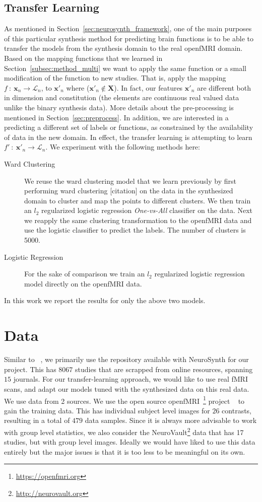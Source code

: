 \documentclass{article} %
\begin{document}
 \subsection{Transfer Learning}
 As mentioned in Section~\ref{sec:neurosynth_framework}, one of the main purposes of this particular synthesis method for predicting brain functions is to be able to transfer the models from the synthesis domain to the real openfMRI domain. Based on the mapping functions that we learned in Section~\ref{subsec:method_multi} we want to apply the same function or a small modification of the function to new studies. That is, apply the mapping $f\ :\ \mathbf{x}_n \rightarrow \mathcal{L}_n$, to $\mathbf{x}'_n$ where ($\mathbf{x}'_n \notin \mathbf{X}$). In fact, our features $\mathbf{x}'_n$ are different both in dimension and constitution (the elements are continuous real valued data unlike the binary synthesis data). More details about the pre-processing is mentioned in Section~\ref{sec:preprocess}. In addition, we are interested in a predicting a different set of labels or functions, as constrained by the availability of data in the new domain. In effect, the transfer learning is attempting to learn $f'\ :\ \mathbf{x}'_n \rightarrow \mathcal{L}_n$. We experiment with the following methods here:
  \begin{description}
  \item[Ward Clustering] We reuse the ward clustering model that we learn previously by first performing ward clustering [citation] on the data in the synthesized domain to cluster and map the points to different clusters. We then train an $l_2$ regularized logistic regression \textit{One-vs-All} classifier on the data. Next we reapply the same clustering transformation to the openfMRI data and use the logistic classifier to predict the labels. The number of clusters is 5000.
  \item[Logistic Regression] For the sake of comparison we train an $l_2$ regularized logistic regression model directly on the openfMRI data.
  \end{description}
In this work we report the results for only the above two models. 

\section{Data}\label{sec:data}
Similar to ~\cite{yarkoni2011large}, we primarily use the repository available with NeuroSynth for our project. This has $8067$ studies that are scrapped from online resources, spanning $15$ journals. For our transfer-learning approach, we would like to use real fMRI scans, and adapt our models tuned with the synthesized data on this real data. We use data from 2 sources. We use the open source openfMRI~\footnote{\protect \url{https://openfmri.org}} project ~\cite{poldrack2013toward} to gain the training data. This has individual subject level images for $26$ contrasts, resulting in a total of $479$ data samples. Since it is always more advisable to work with group level statistics, we also consider the NeuroVault\footnote{\protect \url{http://neurovault.org}} data that has 17 studies, but with group level images. Ideally we would have liked to use this data entirely but the major issues is that it is too less to be meaningful on its own. 
\end{document}
